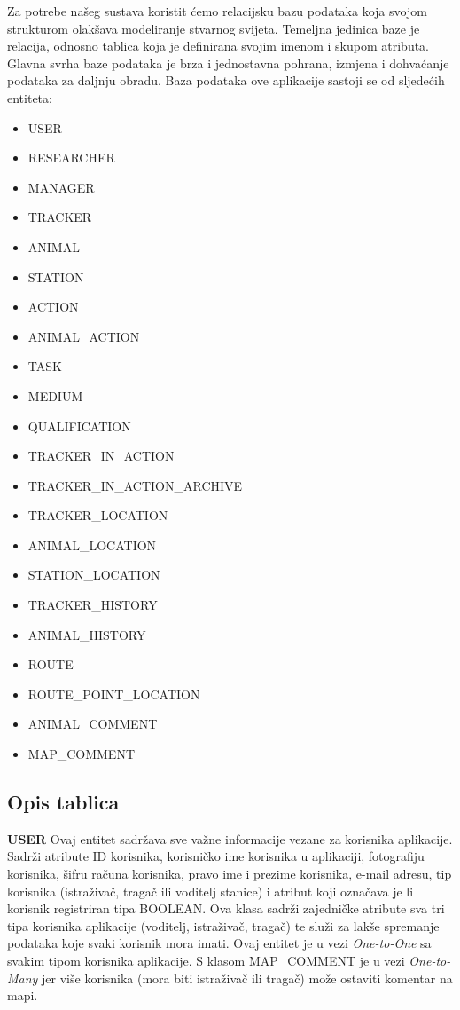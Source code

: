 				\noindent Za potrebe našeg sustava koristit ćemo relacijsku bazu podataka koja svojom strukturom olakšava modeliranje stvarnog svijeta. Temeljna jedinica baze je relacija, odnosno tablica koja je definirana svojim imenom i skupom atributa. Glavna svrha baze podataka je brza i jednostavna pohrana, izmjena i dohvaćanje podataka za daljnju obradu. Baza podataka ove aplikacije sastoji se od sljedećih entiteta:
				
				\begin{itemize}
					\item USER
					\item RESEARCHER
					\item MANAGER
					\item TRACKER
					\item ANIMAL
					\item STATION
					\item ACTION
					\item ANIMAL\_ACTION
					\item TASK
					\item MEDIUM
					\item QUALIFICATION
					\item TRACKER\_IN\_ACTION
					\item TRACKER\_IN\_ACTION\_ARCHIVE
					\item TRACKER\_LOCATION
					\item ANIMAL\_LOCATION
					\item STATION\_LOCATION
					\item TRACKER\_HISTORY
					\item ANIMAL\_HISTORY
					\item ROUTE
					\item ROUTE\_POINT\_LOCATION
					\item ANIMAL\_COMMENT
					\item MAP\_COMMENT
				\end{itemize}
				
		\subsection{Opis tablica}
				
				
				\noindent \textbf{USER} \hspace{1em} Ovaj entitet sadržava sve važne informacije vezane za korisnika aplikacije. Sadrži atribute ID korisnika, korisničko ime korisnika u aplikaciji, fotografiju korisnika, šifru računa korisnika, pravo ime i prezime korisnika, e-mail adresu, tip korisnika (istraživač, tragač ili voditelj stanice) i atribut koji označava je li korisnik registriran tipa BOOLEAN.  Ova klasa sadrži zajedničke atribute sva tri tipa korisnika aplikacije (voditelj, istraživač, tragač) te služi za lakše spremanje podataka koje svaki korisnik mora imati. Ovaj entitet je u vezi \textit{One-to-One} sa svakim tipom korisnika aplikacije. S klasom MAP\_COMMENT je u vezi \textit{One-to-Many} jer više korisnika (mora biti istraživač ili tragač) može ostaviti komentar na mapi.
				
